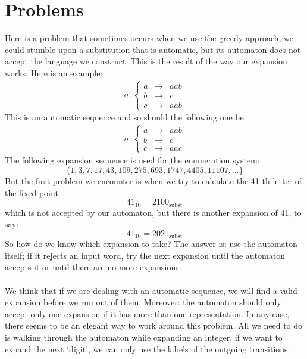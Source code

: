 \documentclass{article}
\begin{document}
\section{Problems}
Here is a problem that sometimes occurs when we use the greedy approach, we
could stumble upon a substitution that is automatic, but its automaton does
not accept the language we construct. This is the result of the way our
expansion works. Here is an example:
\begin{eqnarray*}
\sigma: \left\{ \begin{array}{lll}
a &\rightarrow& aab\\
b &\rightarrow& c\\
c &\rightarrow& aab
\end{array} \right.
\end{eqnarray*}
This is an automatic sequence and so should the following one be:
\begin{eqnarray*}
\sigma: \left\{ \begin{array}{lll}
a &\rightarrow& aab\\
b &\rightarrow& c\\
c &\rightarrow& aac
\end{array} \right.
\end{eqnarray*}
The following expansion sequence is used for the enumeration system:
\begin{displaymath}
\{1, 3, 7, 17, 43, 109, 275, 693, 1747, 4405, 11107, \ldots \}
\end{displaymath}
But the first problem we encounter is when we try to calculate the 41-th
letter of the fixed point:
\begin{displaymath}
41_{10} = 2100_{\mathrm{subst}}
\end{displaymath}
which is not accepted by our automaton, but there is another expansion of
41, to say:
\begin{displaymath}
41_{10} = 2021_{\mathrm{subst}}
\end{displaymath}
So how do we know which expansion to take? The answer is: use the automaton
itself; if it rejects an input word, try the next expansion until the
automaton accepts it or until there are no more expansions.\\
\\
We think that if we are dealing with an automatic sequence, we will find a 
valid expansion before we run out of them. Moreover: the automaton should only 
accept only one expansion if it has more than one representation. In any case, 
there seems to be an elegant way to work around this problem. All we need to 
do is walking through the automaton while expanding an integer, if we want to 
expand the next `digit', we can only use the labels of the outgoing transitions.
\end{document}
